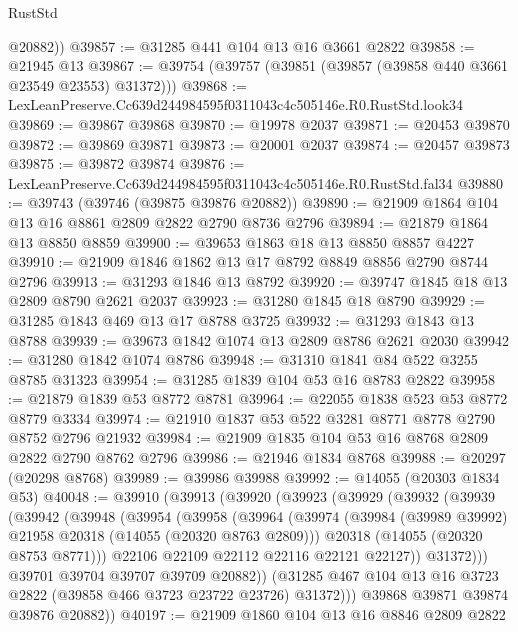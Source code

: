 \begin{lexlean}{RustStd}
\begin{coremodule}
        @20882))
@39857 := @31285 @441 @104 @13 @16 @3661 @2822
@39858 := @21945 @13
@39867 := @39754 (@39757 (@39851 (@39857 (@39858 @440 @3661 @23549 @23553) @31372)))
@39868 := LexLeanPreserve.Cc639d244984595f0311043c4c505146e.R0.RustStd.look34
@39869 := @39867 @39868
@39870 := @19978 @2037
@39871 := @20453 @39870
@39872 := @39869 @39871
@39873 := @20001 @2037
@39874 := @20457 @39873
@39875 := @39872 @39874
@39876 := LexLeanPreserve.Cc639d244984595f0311043c4c505146e.R0.RustStd.fal34
@39880 := @39743 (@39746 (@39875 @39876 @20882))
@39890 := @21909 @1864 @104 @13 @16 @8861 @2809 @2822 @2790 @8736 @2796
@39894 := @21879 @1864 @13 @8850 @8859
@39900 := @39653 @1863 @18 @13 @8850 @8857 @4227
@39910 := @21909 @1846 @1862 @13 @17 @8792 @8849 @8856 @2790 @8744 @2796
@39913 := @31293 @1846 @13 @8792
@39920 := @39747 @1845 @18 @13 @2809 @8790 @2621 @2037
@39923 := @31280 @1845 @18 @8790
@39929 := @31285 @1843 @469 @13 @17 @8788 @3725
@39932 := @31293 @1843 @13 @8788
@39939 := @39673 @1842 @1074 @13 @2809 @8786 @2621 @2030
@39942 := @31280 @1842 @1074 @8786
@39948 := @31310 @1841 @84 @522 @3255 @8785 @31323
@39954 := @31285 @1839 @104 @53 @16 @8783 @2822
@39958 := @21879 @1839 @53 @8772 @8781
@39964 := @22055 @1838 @523 @53 @8772 @8779 @3334
@39974 := @21910 @1837 @53 @522 @3281 @8771 @8778 @2790 @8752 @2796 @21932
@39984 := @21909 @1835 @104 @53 @16 @8768 @2809 @2822 @2790 @8762 @2796
@39986 := @21946 @1834 @8768
@39988 := @20297 (@20298 @8768)
@39989 := @39986 @39988
@39992 := @14055 (@20303 @1834 @53)
@40048 := @39910
    (@39913
      (@39920
        (@39923
          (@39929
            (@39932
              (@39939
                (@39942
                  (@39948
                    (@39954
                      (@39958
                        (@39964
                          (@39974
                            (@39984 (@39989 @39992) @21958 @20318 (@14055 (@20320 @8763 @2809)))
                            @20318
                            (@14055 (@20320 @8753 @8771)))
                          @22106
                          @22109
                          @22112
                          @22116
                          @22121
                          @22127))
                      @31372)))
                @39701
                @39704
                @39707
                @39709
                @20882))
            (@31285 @467 @104 @13 @16 @3723 @2822 (@39858 @466 @3723 @23722 @23726) @31372)))
        @39868
        @39871
        @39874
        @39876
        @20882))
@40197 := @21909
    @1860
    @104
    @13
    @16
    @8846
    @2809
    @2822

\end{coremodule}
\end{lexlean}
